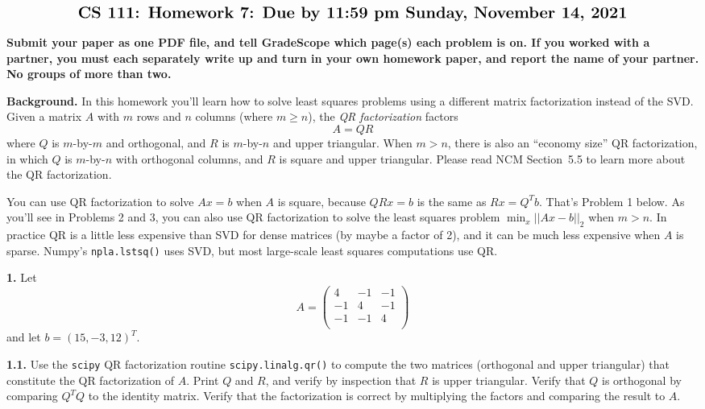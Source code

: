 \documentclass[11pt]{article}
\begin{document}
$$\mbox{\Large \bf CS 111: Homework 7: Due by 11:59 pm Sunday, November 14, 2021}$$
\par\smallskip\noindent
{\bf Submit your paper as one PDF file,
and tell GradeScope which page(s) each problem is on.
If you worked with a partner, 
you must each separately write up and turn in your own homework paper, 
and report the name of your partner.
No groups of more than two.
}

\par\bigskip
{\bf Background.}
In this homework you'll learn how to solve least squares problems using 
a different matrix factorization instead of the SVD.
Given a matrix $A$ with $m$ rows and $n$ columns (where $m \ge n$),
the {\em QR factorization} factors
$$A = QR$$
where $Q$ is $m$-by-$m$ and orthogonal, and $R$ is $m$-by-$n$ and upper triangular.
When $m>n$, there is also an ``economy size'' QR factorization,
in which $Q$ is $m$-by-$n$ with orthogonal columns, 
and $R$ is square and upper triangular.
Please read NCM Section~5.5 to learn more about the QR factorization.

You can use QR factorization to solve $Ax=b$ when $A$ is square,
because $QRx=b$ is the same as $Rx=Q^Tb$. That's Problem 1 below.
As you'll see in Problems 2 and 3, you can also use QR factorization
to solve the least squares problem $\min_x||Ax-b||_2$ when $m>n$.
In practice QR is a little less expensive than SVD for dense matrices
(by maybe a factor of 2), and it can be much less expensive when $A$ is sparse.
Numpy's {\tt npla.lstsq()} uses SVD, 
but most large-scale least squares computations use QR.

\par\bigskip
{\bf 1.}
Let
$$A =
   \left(
   \begin{array}{ccc}
    4 & -1 & -1 \\ 	
   -1 &  4 & -1 \\ 
   -1 & -1 &  4 \\
   \end{array} \right)
$$
and let $b = (15, -3, 12)^T$.

\par\medskip
{\bf 1.1.}
Use the {\tt scipy} QR factorization routine {\tt scipy.linalg.qr()}
to compute the two matrices (orthogonal and upper triangular) that
constitute the QR factorization of $A$.
Print $Q$ and $R$, and verify by inspection that $R$ is upper triangular.
Verify that $Q$ is orthogonal by comparing $Q^TQ$ to the identity matrix.
Verify that the factorization is correct by multiplying the factors and 
comparing the result to $A$.
\end{document}
